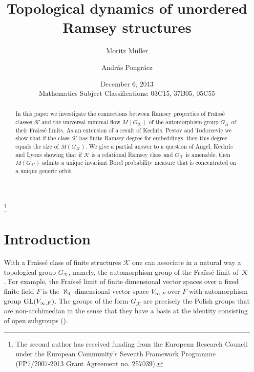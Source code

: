 \documentclass[12pt]{amsart}
\date{{December 6, 2013}\\
\small Mathematics Subject Classifications: 03C15, 37B05, 05C55}
\theoremstyle{plain}
\theoremstyle{definition}
\begin{document}

\title{Topological dynamics of unordered Ramsey structures}

\author{Moritz M\"{u}ller}
\address{Kurt G\"odel Research Center (KGRC), Vienna, Austria.}

\author{Andr\'as Pongr\'acz}
\address{Laboratoire d'Informatique de l'\'Ecole Polytechnique (LIX), Palaiseau, France. }
\thanks{The second author has received funding from the European Research Council under the European Community's Seventh Framework Programme (FP7/2007-2013 Grant Agreement no. 257039).}

\begin{abstract}
In this paper we investigate the connections between Ramsey properties of Fra\"{\i}ss\'{e} 
classes ${\mathcal K}$ and the universal minimal flow $M(G_{\mathcal K})$ of the automorphism group $G_{\mathcal K}$
of their Fra\"{\i}ss\'{e} limits. As an extension of a result of Kechris, Pestov and Todorcevic \cite{kpt} 
we show that if the class ${\mathcal K}$ has finite Ramsey degree 
for embeddings, then this degree equals the size of $M(G_{\mathcal K})$. 
We give a partial answer to a question of Angel, 
Kechris and Lyons \cite{akl} showing that 
if ${\mathcal K}$ is a relational Ramsey class and $G_{\mathcal K}$ is amenable, then $M(G_{\mathcal K})$ admits a unique
invariant Borel probability measure that is concentrated on a unique generic orbit.
\end{abstract}

 \maketitle

\section{Introduction}

With a Fra\"iss\'e class of finite structures ${\mathcal K}$ one can associate in a natural way a topological group $G_{\mathcal K}$, namely, the automorphism group of the Fra\"iss\'e limit of~${\mathcal K}$. 
For example, the
Fra\"iss\'e limit of finite dimensional vector spaces over a 
fixed finite field $F$ is the $\aleph_0$-dimensional vector space $V_{\infty,F}$ over 
$F$ with automorphism group $\textup{GL}(V_{\infty,F})$.
The groups of the form $G_{\mathcal K}$ are precisely the Polish groups that are non-archimedian in the sense 
that they have a basis at the identity consisting of open subgroups (\cite{kb}). 
\end{document}
